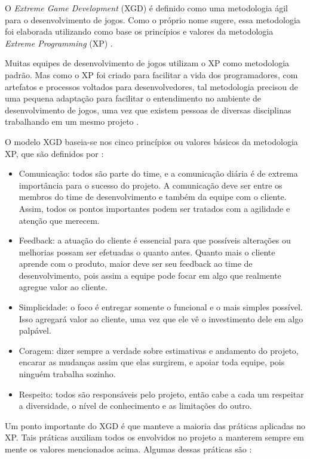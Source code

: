 \documentclass[quali]{ppgccufscar}
\begin{document}
O \textit{Extreme Game Development} (XGD) é definido como uma metodologia ágil para o desenvolvimento de jogos. Como o próprio nome sugere, essa metodologia foi elaborada utilizando como base os princípios e valores da metodologia \textit{Extreme Programming} (XP) \cite{demachy2003}.

Muitas equipes de desenvolvimento de jogos utilizam o XP como metodologia padrão. Mas como o XP foi criado para facilitar a vida dos programadores, com artefatos e processos voltados para desenvolvedores, tal metodologia precisou de uma pequena adaptação para facilitar o entendimento no ambiente de desenvolvimento de jogos, uma vez que existem pessoas de diversas disciplinas trabalhando em um mesmo projeto \cite{demachy2003}.

O modelo XGD baseia-se nos cinco princípios ou valores básicos da metodologia XP, que são definidos por : 

\begin{itemize}
	\item Comunicação: todos são parte do time, e a comunicação diária é de extrema importância para o sucesso do projeto. A comunicação deve ser entre os membros do time de desenvolvimento e também da equipe com o cliente. Assim, todos os pontos importantes podem ser tratados com a agilidade e atenção que merecem.
	\item Feedback: a atuação do cliente é essencial para que possíveis alterações ou melhorias possam ser efetuadas o quanto antes. Quanto mais o cliente aprende com o produto, maior deve ser seu feedback ao time de desenvolvimento, pois assim a equipe pode focar em algo que realmente agregue valor ao cliente.
	\item Simplicidade: o foco é entregar somente o funcional e o mais simples possível. Isso agregará valor ao cliente, uma vez que ele vê o investimento dele em algo palpável.
	\item Coragem: dizer sempre a verdade sobre estimativas e andamento do projeto, encarar as mudanças assim que elas surgirem, e apoiar toda equipe, pois ninguém trabalha sozinho.
	\item Respeito: todos são responsáveis pelo projeto, então cabe a cada um respeitar a diversidade, o nível de conhecimento e as limitações do outro.
\end{itemize}

Um ponto importante do XGD é que manteve a maioria das práticas aplicadas no XP. Tais práticas auxiliam todos os envolvidos no projeto a manterem sempre em mente os valores mencionados acima. Algumas dessas práticas são \cite{teles2014}:
\end{document}
